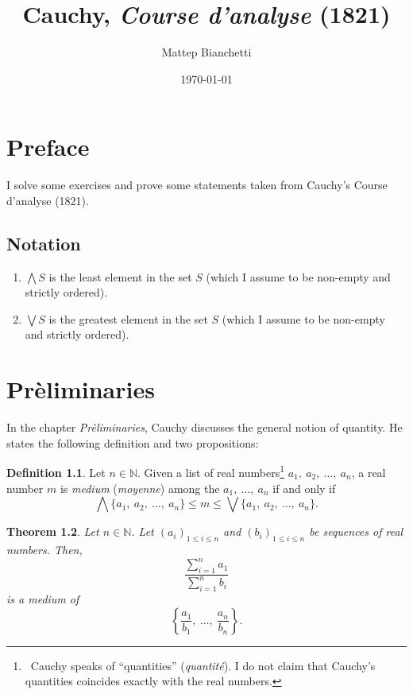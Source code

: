 \documentclass[11pt,oneside]{book}
\title{Cauchy, \textit{Course d'analyse} (1821)}
\author{Mattep Bianchetti}
\date{\today}  %
\newtheorem{theorem}{Theorem}[chapter]
\theoremstyle{definition}
\newtheorem{definition}[theorem]{Definition}
\theoremstyle{remark}
\newcommand{\N}{\mathbb{N}}  %
\begin{document}
\frontmatter
\maketitle

\tableofcontents

\mainmatter

\chapter*{Preface}
I solve some exercises and prove some statements taken from Cauchy's Course d'analyse (1821).

\section*{Notation}
\begin{enumerate}
    \item $\bigwedge S$ is the least element in the set $S$ (which I assume to be non-empty and strictly ordered).
    \item $\bigvee S$ is the greatest element in the set $S$ (which I assume to be non-empty and strictly ordered).
\end{enumerate}
 
\chapter{Pr\`{e}liminaries}
In the chapter \textit{Pr\`{e}liminaries}, Cauchy discusses the general notion of quantity. He states the following definition and two propositions:

\bigskip

\begin{definition}
    Let $n\in \N$. Given a list of real numbers\footnote{
    ~Cauchy speaks of ``quantities'' (\textit{quantit\'{e}}). I do not claim that Cauchy's quantities coincides exactly with the real numbers.
    }
    $a_1,\ a_2,\ \dots,\ a_n$, a real number $m$ is \textit{medium} (\textit{moyenne}) among the $a_1,\ \dots,\ a_n$ if and only if
    \[
        \bigwedge \{a_1,\ a_2,\ \dots,\ a_n\} \leq m \leq \bigvee \{a_1,\ a_2,\ \dots,\ a_n\}.
    \]
\end{definition}

\bigskip

\begin{theorem}\label{theorem.medium}
Let $n\in \N$. Let $(a_i)_{1\leq i \leq n}$ and $(b_i)_{1\leq i \leq n}$ be sequences of real numbers. Then,
\[
    \frac{\sum_{i=1}^{n} a_1}{\sum_{i=1}^{n} b_i}
\]
is a medium of  
\[
    \left\{ \frac{a_1}{b_1},\ \dots,\ \frac{a_n}{b_n} \right\}.
\]
\end{theorem}
\end{document}
